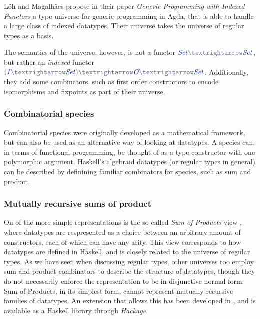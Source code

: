 \documentclass[a4paper,msc,twosized=semi]{uustthesis}
\let\oldemph\emph
\renewcommand\emph[1]{{\large\oldemph{#1}}}
\newcommand*{\mathcolor}{}
\def\mathcolor#1#{\mathcoloraux{#1}}
\newcommand*{\mathcoloraux}[3]{%
  \protect\leavevmode
  \begingroup
    \color#1{#2}#3%
  \endgroup
}
\newcommand{\HSSpecial}[1]{\mathcolor{hsblue4}{#1}}
\newcommand{\HSSym}[1]{\mathcolor{hsblue4}{#1}}
\newcommand{\HSCon}[1]{\mathcolor{hsblue3}{\mathit{#1}}}
\begin{document}
  Löh and Magalhães propose in their paper \emph{Generic Programming with Indexed 
  Functors} \cite{loh2011generic} a type universe for generic programming in Agda, 
  that is able to handle a large class of indexed datatypes. Their universe takes the 
  universe of regular types as a basis. 
  
  The semantics of the universe, however, is not a functor \ensuremath{\HSCon{Set}\HSSym{→}\HSCon{Set}}, but rather an 
  \emph{indexed} functor \ensuremath{\HSSpecial{(}\HSCon{I}\HSSym{→}\HSCon{Set}\HSSpecial{)}\HSSym{→}\HSCon{O}\HSSym{→}\HSCon{Set}}. Additionally, they add some 
  combinators, such as first order constructors to encode isomorphisms and fixpoints 
  as part of their universe. 

\subsubsection{Combinatorial species}

  Combinatorial species \cite{yorgey2010species} were 
  originally developed as a mathematical framework, but can also be used as an 
  alternative way of looking at datatypes. A species can, in terms of functional 
  programming, be thought of as a type constructor with one polymorphic argument. 
  Haskell’s algebraid datatypes (or regular types in general) can be described by definining familiar 
  combinators for species, such as sum and product.

\subsubsection{Mutually recursive sums of product}

  On of the more simple representations is the so called \textit{Sum of Products} view 
  \cite{de2014true}, where datatypes are respresented as a choice between an arbitrary 
  amount of constructors, each of which can have any arity. This view corresponds to 
  how datatypes are defined in Haskell, and is closely related to the universe of 
  regular types. As we have seen when discussing regular types, other 
  universes too employ sum and product combinators to describe the structure of 
  datatypes, though they do not necessarily enforce the representation to be in 
  disjunctive normal form. Sum of Products, in its simplest form, cannot represent 
  mutually recursive families of datatypes. An extension that allows this has been 
  developed in \cite{miraldo2018sums}, and is available as a Haskell library through 
  \emph{Hackage}.  
\end{document}
